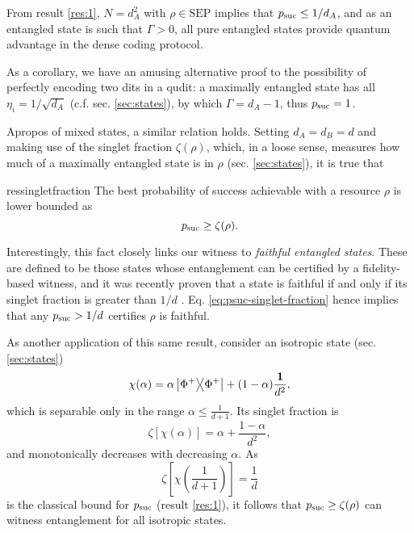         From result \ref{res:1}, $N = d_A^2$ with $\rho \in \text{SEP}$ implies that $p_{\text{suc}} \leq 1 / d_A$, and as an entangled state is such that $\Gamma > 0$, all pure entangled states provide quantum advantage in the dense coding protocol.
        
        As a corollary, we have an amusing alternative proof to the possibility of perfectly encoding two dits in a qudit: a maximally entangled state has all $\eta_i = 1 / \sqrt{d_A}$ (c.f. sec. \ref{sec:states}), by which $\Gamma = d_A - 1$, thus $p_{\text{suc}} = 1$.
        
        Apropos of mixed states, a similar relation holds. Setting $d_A = d_B = d$ and making use of the singlet fraction $\zeta(\rho)$, which, in a loose sense, measures how much of a maximally entangled state is in $\rho$ (sec. \ref{sec:states}), it is true that
        \begin{restatable}{res}{singletfraction}
            The best probability of success achievable with a resource $\rho$ is lower bounded as
           \begin{equation}
                p_{\text{suc}} \geq \zeta(\rho) .
                \label{eq:psuc-singlet-fraction}
            \end{equation}
        \label{res:singlet-fraction-bound}
        \end{restatable}

        Interestingly, this fact closely links our witness to \emph{faithful entangled states}. These are defined to be those states whose entanglement can be certified by a fidelity-based witness, and it was recently proven that a state is faithful if and only if its singlet fraction is greater than $1/d$ \cite{guhne_faithful_2021}. Eq. \ref{eq:psuc-singlet-fraction} hence implies that any $p_{\text{suc}} > 1/d$ certifies $\rho$ is faithful. 
 
        As another application of this same result, consider an isotropic state (sec. \ref{sec:states})
        $$
            \chi(\alpha) = \alpha \ketbra{\Phi^+}{\Phi^+} + (1 - \alpha) \frac{\mathbf{1}}{d^2} ,
        $$
        which is separable only in the range $\alpha \leq \frac{1}{d + 1}$. Its singlet fraction is
        $$
            \zeta\left[ \chi(\alpha) \right] = \alpha + \frac{1 - \alpha}{d^2} ,
        $$
        and monotonically decreases with decreasing $\alpha$. As
        $$
            \zeta \left[ \chi \left( \frac{1}{d + 1} \right) \right] = \frac{1}{d}
        $$
        is the classical bound for $p_{\text{suc}}$ (result \ref{res:1}), it follows that $p_{\text{suc}} \geq \zeta(\rho)$ can witness entanglement for all isotropic states.        

